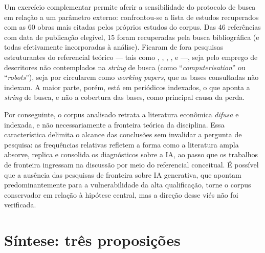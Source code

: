 Um exercício complementar permite aferir a sensibilidade do protocolo de busca em relação a um parâmetro externo: confrontou-se a lista de estudos recuperados com as 60 obras mais citadas pelos próprios estudos do corpus. Das 46 referências com data de publicação elegível, 15 foram recuperadas pela busca bibliográfica (e todas efetivamente incorporadas à análise). Ficaram de fora pesquisas estruturantes do referencial teórico --- tais como \textcite{frey2017}, \textcite{acemogluRestrepo2020robots}, \textcite{webb2020}, \textcite{felten2021}, \textcite{eloundou2024} e \textcite{noyZhang2023} ---, seja pelo emprego de descritores não contemplados na \textit{string} de busca (como ``\textit{computerisation}'' ou ``\textit{robots}''), seja por circularem como \textit{working papers}, que as bases consultadas não indexam. A maior parte, porém, está em periódicos indexados, o que aponta a \textit{string} de busca, e não a cobertura das bases, como principal causa da perda.


Por conseguinte, o corpus analisado retrata a literatura econômica \emph{difusa} e indexada, e não necessariamente a fronteira teórica da disciplina. Essa característica delimita o alcance das conclusões sem invalidar a pergunta de pesquisa: as frequências relativas refletem a forma como a literatura ampla absorve, replica e consolida os diagnósticos sobre a IA, ao passo que os trabalhos de fronteira ingressam na discussão por meio do referencial conceitual. É possível que a ausência das pesquisas de fronteira sobre IA generativa, que apontam predominantemente para a vulnerabilidade da alta qualificação, torne o corpus conservador em relação à hipótese central, mas a direção desse viés não foi verificada.

\section{Síntese: três proposições}

